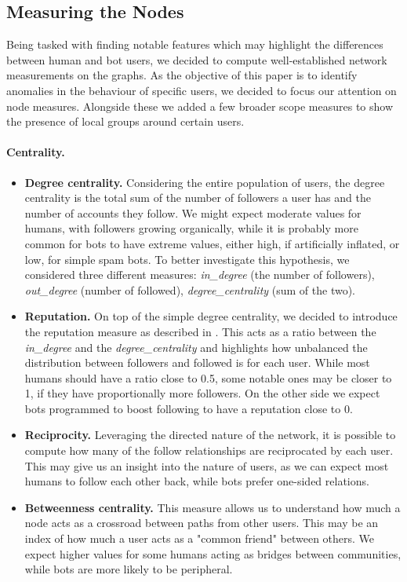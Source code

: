 \documentclass[12pt, a4paper]{article}
\begin{document}
	\subsection{Measuring the Nodes}
		Being tasked with finding notable features which may highlight the differences between human and bot users, we decided to compute well-established network measurements on the graphs. As the objective of this paper is to identify anomalies in the behaviour of specific users, we decided to focus our attention on node measures. Alongside these we added a few broader scope measures to show the presence of local groups around certain users.
		\paragraph{Centrality.}
		\begin{itemize}
			\item \textbf{Degree centrality.} Considering the entire population of users, the degree centrality is the total sum of the number of followers a user has and the number of accounts they follow. We might expect moderate values for humans, with followers growing organically, while it is probably more common for bots to have extreme values, either high, if artificially inflated, or low, for simple spam bots. To better investigate this hypothesis, we considered three different measures: \textit{in\_degree} (the number of followers), \textit{out\_degree} (number of followed), \textit{degree\_centrality} (sum of the two).
			\item \textbf{Reputation.} On top of the simple degree centrality, we decided to introduce the reputation measure as described in \cite{Beskow2020FriendBot}. This acts as a ratio between the \textit{in\_degree} and the \textit{degree\_centrality} and highlights how unbalanced the distribution between followers and followed is for each user. While most humans should have a ratio close to 0.5, some notable ones may be closer to 1, if they have proportionally more followers. On the other side we expect bots programmed to boost following to have a reputation close to 0.
			\item \textbf{Reciprocity.} Leveraging the directed nature of the network, it is possible to compute how many of the follow relationships are reciprocated by each user. This may give us an insight into the nature of users, as we can expect most humans to follow each other back, while bots prefer one-sided relations.
			\item \textbf{Betweenness centrality.} This measure allows us to understand how much a node acts as a crossroad between paths from other users. This may be an index of how much a user acts as a "common friend" between others. We expect higher values for some humans acting as bridges between communities, while bots are more likely to be peripheral.

\end{itemize}
\end{document}
